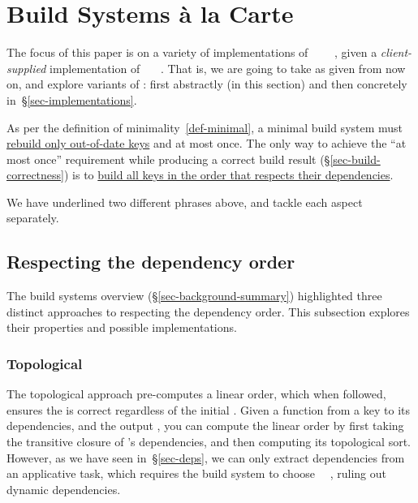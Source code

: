 \section{Build Systems \`a la Carte}\label{sec-build}

The focus of this paper is on a variety of implementations of
~~~~, given
a \emph{client-supplied} implementation of ~~~. That
is, we are going to take  as given from now on, and explore variants of
: first abstractly (in this section) and then concretely
in~\S\ref{sec-implementations}.

As per the definition of minimality~\ref{def-minimal}, a minimal build
system must \underline{rebuild only out-of-date keys} and at most once. The only
way to achieve the ``at most once'' requirement while producing a correct build
result (\S\ref{sec-build-correctness}) is to \underline{build all keys in the
order that respects their dependencies}.

\vspace{1mm}
We have underlined two different phrases above, and tackle each aspect separately.

\subsection{Respecting the dependency order}
\label{sec-dependency-orderings}

The build systems overview (\S\ref{sec-background-summary}) highlighted three
distinct approaches to respecting the dependency order. This subsection explores
their properties and possible implementations.

\subsubsection{Topological}

The topological approach pre-computes a linear order, which when followed, ensures
the  is correct regardless of the initial . Given a function
from a key to its dependencies, and the output , you can compute the
linear order by first taking the transitive closure of 's dependencies,
and then computing its topological sort. However, as we have seen
in~\S\ref{sec-deps}, we can only extract dependencies from an applicative task,
which requires the build system to choose ~\hs{=}~, ruling
out dynamic dependencies.

